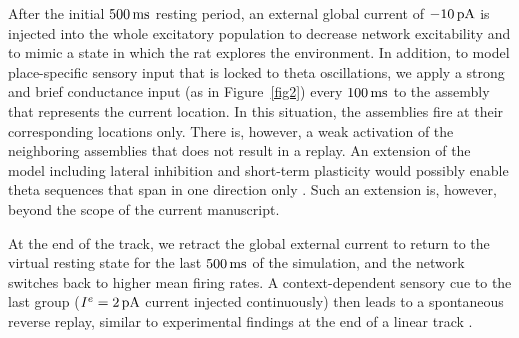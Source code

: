     After the initial $500 \, \rm ms$ resting period, an external global
    current of $-10 \, \rm pA$ is injected into the whole excitatory population
    to decrease network excitability and to mimic a state in which the rat
    explores the environment.  In addition, to model place-specific sensory
    input that is locked to theta oscillations, we apply a strong and brief
    conductance input (as in Figure~\ref{fig2}) every $100 \, \rm ms$ to the
    assembly that represents the current location. In this situation, the
    assemblies fire at their corresponding locations only. There is, however, a
    weak activation of the neighboring assemblies that does not result in a
    replay. An extension of the model including lateral inhibition and
    short-term plasticity would possibly enable theta sequences that span in
    one direction only \citep{Romani2015}. Such an extension is, however, beyond
    the scope of the current manuscript.
        
    At the end of the track, we retract the global external current to return
    to the virtual resting state for the last $500 \, \rm ms$ of the
    simulation, and the network switches back to higher mean firing rates. A
    context-dependent sensory cue to the last group ($I^e=2 \, \rm pA$ current
    injected continuously) then leads to a spontaneous reverse replay, similar
    to experimental findings at the end of a linear track \citep{Foster2006,
    Diba2007}.

